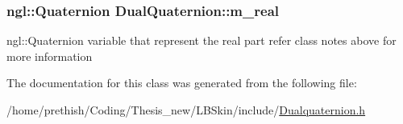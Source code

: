 \hypertarget{class_dual_quaternion_ac1a2af444f75c714de7500fc19481384}{
\subsubsection[{m\-\_\-real}]{\setlength{\rightskip}{0pt plus 5cm}ngl\-::\-Quaternion Dual\-Quaternion\-::m\-\_\-real\hspace{0.3cm}{\ttfamily [protected]}}}\label{class_dual_quaternion_ac1a2af444f75c714de7500fc19481384}


ngl\-::\-Quaternion variable that represent the real part refer class notes above for more information 



The documentation for this class was generated from the following file\-:\begin{DoxyCompactItemize}
\item 
/home/prethish/\-Coding/\-Thesis\-\_\-new/\-L\-B\-Skin/include/\hyperlink{_dualquaternion_8h}{Dualquaternion.\-h}\end{DoxyCompactItemize}
